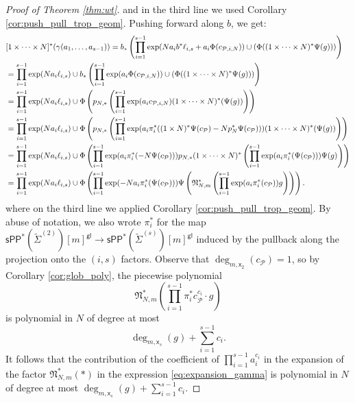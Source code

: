 \documentclass[11pt]{article}
\newcommand{\sPP}{\mathsf{sPP}}
\newcommand{\spp}{\sPP}
\theoremstyle{definition}
\begin{document}
\begin{proof}[Proof of Theorem \ref{thm:wt}]
	and in the third line we used Corollary \ref{cor:push_pull_trop_geom}. Pushing forward along $b$, we get:
	{\allowdisplaybreaks\begin{align}
		&[1\times \dots\times N]^{\ast}(\gamma(a_1,\dots,a_{s-1}))=b_{\ast}\left(\prod_{i=1}^{s-1}\exp(Na_ib^{\ast}\ell_{i,s}+a_i\Phi(c_{\mathcal P,i,N}))\cup(\Phi((1\times \dots\times N)^{\ast}\Psi(g)))\right)\notag\\
		&=\prod_{i=1}^{s-1}\exp(Na_i\ell_{i,s})\cup b_{\ast}\left(\prod_{i=1}^{s-1}\exp(a_i\Phi(c_{\mathcal P,i,N}))\cup(\Phi((1\times \dots\times N)^{\ast}\Psi(g)))\right)\notag\\
		&=\prod_{i=1}^{s-1}\exp(Na_i\ell_{i,s})\cup\Phi\left(p_{N,\ast}\left(\prod_{i=1}^{s-1}\exp(a_ic_{\mathcal P,i,N})(1\times \dots\times N)^{\ast}(\Psi(g))\right)\right)\notag\\
		&=\prod_{i=1}^{s-1}\exp(Na_i\ell_{i,s})\cup\Phi \left(p_{N,\ast}\left(\prod_{i=1}^{s-1}\exp(a_i\pi_i^{\ast}((1\times N)^{\ast}\Psi(c_{\mathcal P})-Np_N^{\ast}\Psi(c_{\mathcal P})))(1\times \dots\times N)^{\ast}(\Psi(g))\right)\right)\notag\\
		&=\prod_{i=1}^{s-1}\exp(Na_i\ell_{i,s})\cup\Phi\left(\prod_{i=1}^{s-1}\exp(a_i\pi_i^{\ast}(-N\Psi(c_{\mathcal P}))) p_{N,\ast}(1\times\dots\times N)^{\ast}\left(\prod_{i=1}^{s-1}\exp(a_i\pi_i^{\ast}(\Psi(c_{\mathcal P})))\Psi(g)\right)\right)\notag\\
		&=\prod_{i=1}^{s-1}\exp(Na_i\ell_{i,s})\cup\Phi\left(\prod_{i=1}^{s-1}\exp(-Na_i\pi_i^{\ast}(\Psi(c_{\mathcal P}))) \Psi\left(\mathfrak{N}_{N,m}^{\ast}\left(\prod_{i=1}^{s-1}\exp(a_i\pi_i^{\ast}(c_{\mathcal P}))g\right)\right)\right)\label{eq:expansion_gamma}.
	\end{align}}
	where on the third line we applied Corollary \ref{cor:push_pull_trop_geom}.
	By abuse of notation, we also wrote $\pi_i^{\ast}$ for the map $\spp^{\ast}(\tilde{\Sigma}^{(2)})[m]^{\mathsf{gl}}\to \spp^{\ast}(\tilde{\Sigma}^{(s)})[m]^{\mathsf{gl}}$
	induced by the pullback along the projection onto the $(i,s)$ factors. Observe that $\deg_{m,\mathsf{x}_2}(c_{\mathcal P})=1$, so by
	Corollary \ref{cor:glob_poly}, the piecewise polynomial
	$$\mathfrak{N}_{N,m}^{\ast}\left(\prod_{i=1}^{s-1}\pi_i^{\ast}c_{\mathcal P}^{c_i}\cdot g \right)$$
	is polynomial in $N$ of degree at most
	$$\deg_{m,\mathsf{x}_s}(g)+\sum_{i=1}^{s-1}c_i.$$
	It follows that the contribution of the coefficient of $\prod_{i=1}^{s-1}a_i^{c_i}$ in the expansion of the factor $\mathfrak N_{N,m}^{\ast}(\ast)$
	in the expression \ref{eq:expansion_gamma} is polynomial in $N$ of degree at most $\deg_{m,\mathsf{x}_s}(g)+\sum_{i=1}^{s-1}c_i$.

\end{proof}
\end{document}
